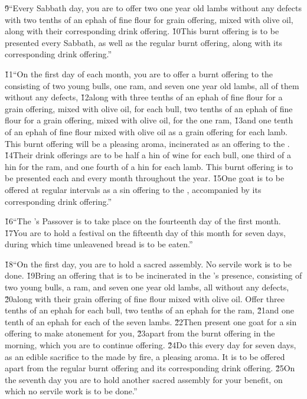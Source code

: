 \v{9}``Every Sabbath day, you are to offer two one year old lambs without any defects with two tenths of an ephah of fine flour for grain offering, mixed with olive oil, along with their corresponding drink offering. \v{10}This burnt offering is to be presented every Sabbath, as well as the regular burnt offering, along with its corresponding drink offering.''

\v{11}``On the first day of each month, you are to offer a burnt offering to the  consisting of two young bulls, one ram, and seven one year old lambs, all of them without any defects, \v{12}along with three tenths of an ephah of fine flour for a grain offering, mixed with olive oil, for each bull, two tenths of an ephah of fine flour for a grain offering, mixed with olive oil, for the one ram, \v{13}and one tenth of an ephah of fine flour mixed with olive oil as a grain offering for each lamb. This burnt offering will be a pleasing aroma, incinerated as an offering to the . \v{14}Their drink offerings are to be half a hin of wine for each bull, one third of a hin for the ram, and one fourth of a hin for each lamb. This burnt offering is to be presented each and every month throughout the year. \v{15}One goat is to be offered at regular intervals as a sin offering to the , accompanied by its corresponding drink offering.''

\v{16}``The 's Passover is to take place on the fourteenth day of the first month. \v{17}You are to hold a festival on the fifteenth day of this month for seven days, during which time unleavened bread is to be eaten.''

\v{18}``On the first day, you are to hold a sacred assembly. No servile work is to be done. \v{19}Bring an offering that is to be incinerated in the 's presence, consisting of two young bulls, a ram, and seven one year old lambs, all without any defects, \v{20}along with their grain offering of fine flour mixed with olive oil. Offer three tenths of an ephah for each bull, two tenths of an ephah for the ram, \v{21}and one tenth of an ephah for each of the seven lambs. \v{22}Then present one goat for a sin offering to make atonement for you, \v{23}apart from the burnt offering in the morning, which you are to continue offering. \v{24}Do this every day for seven days, as an edible sacrifice to the  made by fire, a pleasing aroma. It is to be offered apart from the regular burnt offering and its corresponding drink offering. \v{25}On the seventh day you are to hold another sacred assembly for your benefit, on which no servile work is to be done.''

